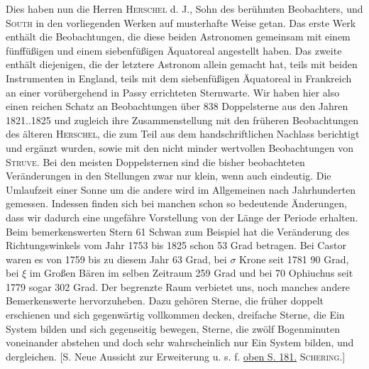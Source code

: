 Dies haben nun die Herren \textsc{Herschel} d. J., Sohn des berühmten Beobachters, und \textsc{South} in den vorliegenden Werken auf musterhafte Weise getan. Das erste Werk enthält die Beobachtungen, die diese beiden Astronomen gemeinsam mit einem fünffüßigen und einem siebenfüßigen Äquatoreal angestellt haben. Das zweite enthält diejenigen, die der letztere Astronom allein gemacht hat, teils mit beiden Instrumenten in England, teils mit dem siebenfüßigen Äquatoreal in Frankreich an einer vorübergehend in Passy errichteten Sternwarte. Wir haben hier also einen reichen Schatz an Beobachtungen über 838 Doppelsterne aus den Jahren 1821..1825 und zugleich ihre Zusammenstellung mit den früheren Beobachtungen des älteren \textsc{Herschel}, die zum Teil aus dem handschriftlichen Nachlass berichtigt und ergänzt wurden, sowie mit den nicht minder wertvollen Beobachtungen von \textsc{Struve}. Bei den meisten Doppelsternen sind die bisher beobachteten Veränderungen in den Stellungen zwar nur klein, wenn auch eindeutig. Die Umlaufzeit einer Sonne um die andere wird im Allgemeinen nach Jahrhunderten gemessen. Indessen finden sich bei manchen schon so bedeutende Änderungen, dass wir dadurch eine ungefähre Vorstellung von der Länge der Periode erhalten. Beim bemerkenswerten Stern 61 Schwan zum Beispiel hat die Veränderung des Richtungswinkels vom Jahr 1753 bis 1825 schon 53 Grad betragen. Bei Castor waren es von 1759 bis zu diesem Jahr 63 Grad, bei $\sigma$ Krone seit 1781 90 Grad, bei $\xi$ im Großen Bären im selben Zeitraum 259 Grad und bei 70 Ophiuchus seit 1779 sogar 302 Grad. Der begrenzte Raum verbietet uns, noch manches andere Bemerkenswerte hervorzuheben. Dazu gehören Sterne, die früher doppelt erschienen und sich gegenwärtig vollkommen decken, dreifache Sterne, die Ein System bilden und sich gegenseitig bewegen, Sterne, die zwölf Bogenminuten voneinander abstehen und doch sehr wahrscheinlich nur Ein System bilden, und dergleichen. [S. Neue Aussicht zur Erweiterung u. s. f. \hyperlink{native-186}{oben S. 181.} \textsc{Schering}.]
\par\clearpage\endgroup
